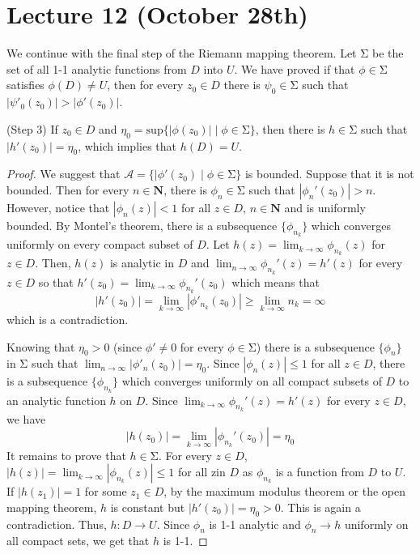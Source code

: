 \section{Lecture 12 (October 28th)}
\begin{rmk}
We continue with the final step of the Riemann mapping theorem. Let $\mathrm{\Sigma} $ be the set of all 1-1 analytic functions from $D$ into $U$. We have proved if that $\phi \in \mathrm{\Sigma} $ satisfies $\phi (D)\ne U$, then for every $z_0\in D$ there is $\psi _{0}\in \mathrm{\Sigma} $ such that $|\psi '_{0}(z_0)|>|\phi '(z_0)|$.

\bigskip

(Step 3) If $z_0\in D$ and $\eta _{0}=\mathrm{sup}\{|\phi (z_0)|\;|\; \phi \in \mathrm{\Sigma} \}$, then there is $h\in \mathrm{\Sigma} $ such that $|h'(z_0)|=\eta _{0}$, which implies that $h(D)=U$. 
\end{rmk}
\vspace{2ex}
\begin{proof}
We suggest that $\mathcal{A}=\{|\phi '(z_0) \;|\; \phi \in \mathrm{\Sigma}  \}$ is bounded. Suppose that it is not bounded. Then for every $n\in {\bm N}$, there is $\phi _{n}\in \mathrm{\Sigma} $ such that $|\phi_{n} '(z_{0})|>n$. However, notice that $|\phi _{n}(z)|<1$ for all $z\in D$, $n\in {\bm N}$ and is uniformly bounded. By Montel's theorem, there is a subsequence $\{\phi _{n_{k}}\}$ which converges uniformly on every compact subset of $D$. Let $h(z)=\lim _{k\rightarrow \infty }\phi _{n_{k}}(z)$ for $z\in D$. Then, $h(z)$ is analytic in $D$ and $\lim _{n\rightarrow \infty }\phi _{n_{k}}'(z)=h'(z)$ for every $z\in D$ so that $h'(z_0)=\lim _{k\rightarrow \infty }\phi _{n_{k}}'(z_0)$ which means that 
\[|h'(z_0)|=\lim _{k\rightarrow \infty }|\phi '_{n_{k}}(z_0)|\geq \lim _{k\rightarrow \infty }n_{k}=\infty \]
which is a contradiction.

\bigskip

Knowing that $\eta _{0}>0$ (since $\phi '\ne 0$ for every $\phi \in \mathrm{\Sigma} $) there is a subsequence $\{\phi _{n}\}$ in $\mathrm{\Sigma} $ such that $\lim _{n\rightarrow \infty }|\phi '_{n}(z_0)|=\eta _{0}$. Since $|\phi _{n}(z)|\leq 1 $ for all $z\in D$, there is a subsequence $\{\phi _{n_{k}}\}$ which converges uniformly on all compact subsets of $D$ to an analytic function $h$ on $D$. Since $\lim _{k\rightarrow \infty }\phi _{n_{k}}'(z)=h'(z)$ for every $z\in D$, we have 
\[|h(z_0)|=\lim _{k\rightarrow \infty }|\phi _{n_{k}}'(z_0)|=\eta _{0}\]
It remains to prove that $h\in \mathrm{\Sigma} $. For every $z\in D$, $|h(z)|=\lim _{k\rightarrow \infty }|\phi _{n_{k}}(z)|\leq 1$ for all zin	$D$ as $\phi _{n_{k}}$ is a function from $D$ to $U$. If $|h(z_1)|=1$ for some $z_1\in D$, by the maximum modulus theorem or the open mapping theorem, $h$ is constant but $|h'(z_0)|=\eta _{0}>0$. This is again a contradiction. Thus, $h:D\rightarrow U$. Since $\phi _{n}$ is 1-1 analytic and $\phi _{n}\rightarrow h$ uniformly on all compact sets, we get that $h$ is 1-1.
\end{proof}
